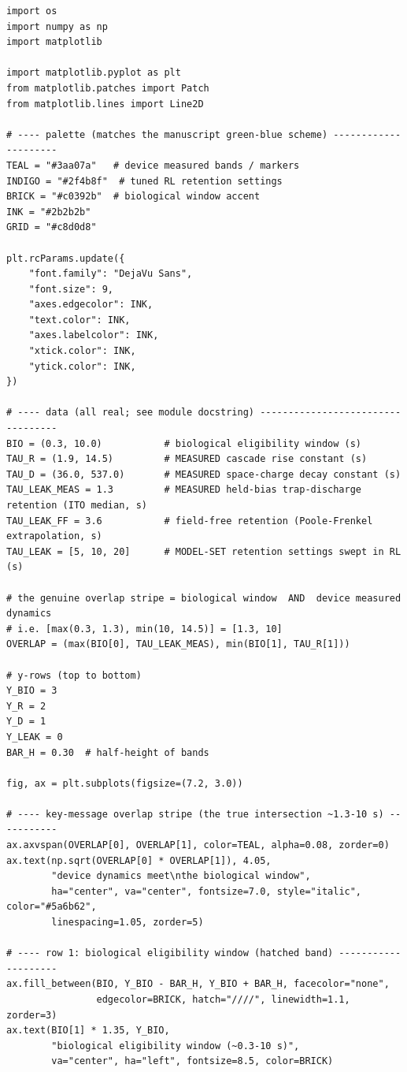 \begin{lstlisting}[caption={schematics.ipynb code cell 10},label={lst:mrl-nb-schematics-10}]
import os
import numpy as np
import matplotlib

import matplotlib.pyplot as plt
from matplotlib.patches import Patch
from matplotlib.lines import Line2D

# ---- palette (matches the manuscript green-blue scheme) ---------------------
TEAL = "#3aa07a"   # device measured bands / markers
INDIGO = "#2f4b8f"  # tuned RL retention settings
BRICK = "#c0392b"  # biological window accent
INK = "#2b2b2b"
GRID = "#c8d0d8"

plt.rcParams.update({
    "font.family": "DejaVu Sans",
    "font.size": 9,
    "axes.edgecolor": INK,
    "text.color": INK,
    "axes.labelcolor": INK,
    "xtick.color": INK,
    "ytick.color": INK,
})

# ---- data (all real; see module docstring) ----------------------------------
BIO = (0.3, 10.0)           # biological eligibility window (s)
TAU_R = (1.9, 14.5)         # MEASURED cascade rise constant (s)
TAU_D = (36.0, 537.0)       # MEASURED space-charge decay constant (s)
TAU_LEAK_MEAS = 1.3         # MEASURED held-bias trap-discharge retention (ITO median, s)
TAU_LEAK_FF = 3.6           # field-free retention (Poole-Frenkel extrapolation, s)
TAU_LEAK = [5, 10, 20]      # MODEL-SET retention settings swept in RL (s)

# the genuine overlap stripe = biological window  AND  device measured dynamics
# i.e. [max(0.3, 1.3), min(10, 14.5)] = [1.3, 10]
OVERLAP = (max(BIO[0], TAU_LEAK_MEAS), min(BIO[1], TAU_R[1]))

# y-rows (top to bottom)
Y_BIO = 3
Y_R = 2
Y_D = 1
Y_LEAK = 0
BAR_H = 0.30  # half-height of bands

fig, ax = plt.subplots(figsize=(7.2, 3.0))

# ---- key-message overlap stripe (the true intersection ~1.3-10 s) -----------
ax.axvspan(OVERLAP[0], OVERLAP[1], color=TEAL, alpha=0.08, zorder=0)
ax.text(np.sqrt(OVERLAP[0] * OVERLAP[1]), 4.05,
        "device dynamics meet\nthe biological window",
        ha="center", va="center", fontsize=7.0, style="italic", color="#5a6b62",
        linespacing=1.05, zorder=5)

# ---- row 1: biological eligibility window (hatched band) --------------------
ax.fill_between(BIO, Y_BIO - BAR_H, Y_BIO + BAR_H, facecolor="none",
                edgecolor=BRICK, hatch="////", linewidth=1.1, zorder=3)
ax.text(BIO[1] * 1.35, Y_BIO,
        "biological eligibility window (~0.3-10 s)",
        va="center", ha="left", fontsize=8.5, color=BRICK)


\end{lstlisting}
